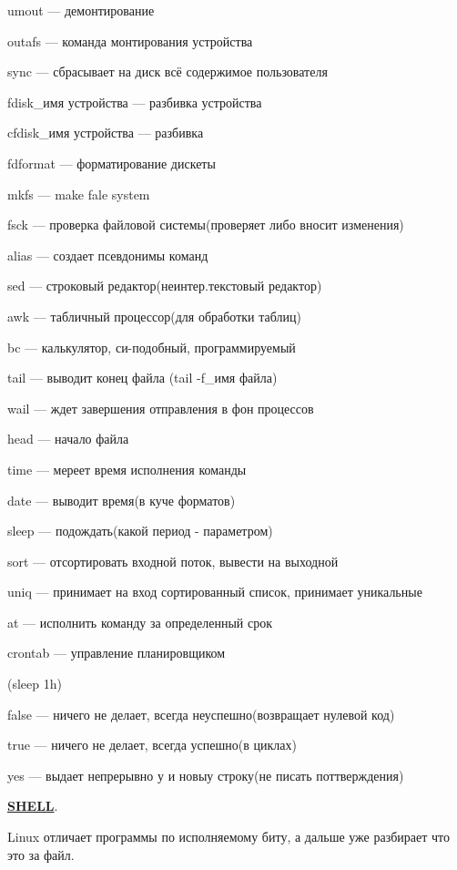 \par 
umout — демонтирование 

\par 
outafs — команда монтирования устройства
\par 
sync — сбрасывает на диск всё содержимое
пользователя
\par 
fdisk\_имя устройства — разбивка устройства

\par 
cfdisk\_имя устройства — разбивка 

\par 
fdformat — форматирование дискеты
\par 
mkfs — make fale system 

\par 
fsck — проверка файловой системы(проверяет
либо вносит изменения)
\par 
alias — создает псевдонимы команд
\par 
sed — строковый редактор(неинтер.текстовый
редактор)
\par 
awk — табличный процессор(для обработки
таблиц)
\par 
bc — калькулятор, си-подобный, программируемый
\par 
tail — выводит конец файла (tail -f\_имя файла)
\par 
wail — ждет завершения отправления в фон
процессов
\par 
head — начало файла
\par 
time — мереет время исполнения команды
\par 
date — выводит время(в куче форматов)
\par 
sleep — подождать(какой период - параметром)
\par 
sort — отсортировать входной поток,
вывести на выходной
\par 
uniq — принимает на вход сортированный
список, принимает уникальные
\par 
at — исполнить команду за определенный
срок
\par 
crontab — управление планировщиком
\par 
(sleep 1h)
\par 
false — ничего не делает, всегда
неуспешно(возвращает нулевой код)
\par 
true — ничего не делает, всегда успешно(в
циклах)
\par 
yes — выдает непрерывно у и новыу строку(не
писать поттверждения)

\par \underline{\textbf{SHELL}}.
\par 
Linux отличает программы по исполняемому
биту, а дальше уже разбирает что это за
файл.

